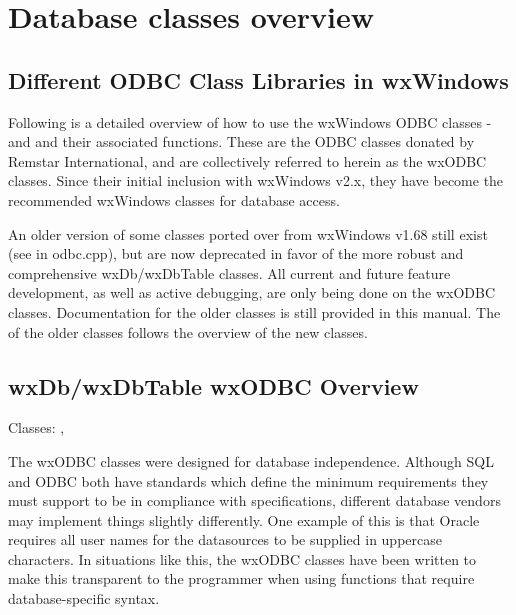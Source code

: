 \section{Database classes overview}\label{odbcoverview}


\subsection{Different ODBC Class Libraries in wxWindows}

Following is a detailed overview of how to use the wxWindows ODBC classes -  
and  and their associated functions. These are 
the ODBC classes donated by Remstar International, and are collectively 
referred to herein as the wxODBC classes. Since their initial inclusion with 
wxWindows v2.x, they have become the recommended wxWindows classes for database 
access.

An older version of some classes ported over from wxWindows v1.68 still exist 
(see  in odbc.cpp), but are now deprecated in favor of the more 
robust and comprehensive wxDb/wxDbTable classes. All current and future 
feature development, as well as active debugging, are only being done on 
the wxODBC classes. Documentation for the older classes is still provided 
in this manual. The  of the 
older classes follows the overview of the new classes.

\subsection{wxDb/wxDbTable wxODBC Overview}\label{wxodbcoverview}

Classes: , 

The wxODBC classes were designed for database independence. Although SQL and 
ODBC both have standards which define the minimum requirements they must 
support to be in compliance with specifications, different database vendors 
may implement things slightly differently. One example of this is that Oracle 
requires all user names for the datasources to be supplied in uppercase 
characters. In situations like this, the wxODBC classes have been written 
to make this transparent to the programmer when using functions that require 
database-specific syntax.

